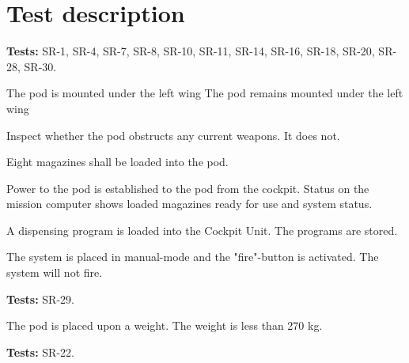 \documentclass[Main]{subfiles}
\begin{document}
\chapter{Test description}

\textbf{Tests: }
SR-1, SR-4, SR-7, SR-8, SR-10, SR-11, SR-14, SR-16, SR-18, SR-20, SR-28, SR-30.


\begin{TestCaseIntro}
\end{TestCaseIntro}

\begin{TestCase}
\TC
{The pod is mounted under the left wing}
{The pod remains mounted under the left wing}

\TC
{Inspect whether the pod obstructs any current weapons.}
{It does not.}

\TC
{Eight magazines shall be loaded into the pod.}
{}

\TC
{Power to the pod is established to the pod from the cockpit.}
{Status on the mission computer shows loaded magazines ready for use and system status.}

\TC
{A dispensing program is loaded into the Cockpit Unit.}
{The programs are stored.}

\TC
{The system is placed in manual-mode and the "fire"-button is activated.}
{The system will not fire.}

\end{TestCase}


\textbf{Tests: } SR-29.


\begin{TestCaseIntro}
\end{TestCaseIntro}

\begin{TestCase}
\TC
{The pod is placed upon a weight.}
{The weight is less than 270 kg.}

\end{TestCase}


\newpage
\textbf{Tests: } SR-22.


\begin{TestCaseIntro}
\end{TestCaseIntro}
\end{document}
